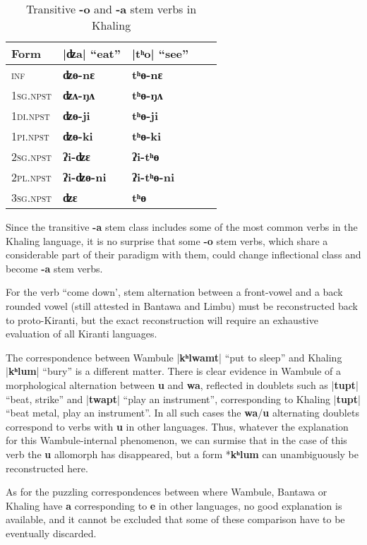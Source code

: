 \documentclass[oldfontcommands,oneside,a4paper,11pt]{article}
\newcommand{\ipa}[1]{\textbf{{\phon\mbox{#1}}}} %
\newcommand{\grise}[1]{\cellcolor{lightgray}\textbf{#1}}
\newcommand{\dhatu}[2]{|\ipa{#1}| ``#2''}
\begin{document}
\begin{table}[H]
\caption{Transitive \ipa{-o} and \ipa{-a} stem verbs in Khaling} \centering \label{tab:a.o}
\begin{tabular}{lllll}
\toprule
Form &\dhatu{ʣa}{eat} & \dhatu{tʰo}{see} \\
\midrule
\textsc{inf} & \ipa{ʣɵ-nɛ} \grise{}& \ipa{tʰɵ-nɛ} \grise{}\\
\textsc{1sg.npst} & \ipa{ʣʌ-ŋʌ} & \ipa{tʰɵ-ŋʌ} \\
\textsc{1di.npst} & \ipa{ʣɵ-ji} \grise{}& \ipa{tʰɵ-ji} \grise{}\\
\textsc{1pi.npst} & \ipa{ʣɵ-ki} \grise{}& \ipa{tʰɵ-ki} \grise{}\\
\textsc{2sg.npst} & \ipa{ʔi-ʣɛ} & \ipa{ʔi-tʰɵ} \\
\textsc{2pl.npst} & \ipa{ʔi-ʣɵ-ni} \grise{}& \ipa{ʔi-tʰɵ-ni} \grise{}\\
\textsc{3sg.npst} & \ipa{ʣɛ} & \ipa{tʰɵ} \\
\bottomrule
\end{tabular}
\end{table}

Since the transitive  \ipa{-a} stem class includes some of the most common verbs in the Khaling language, it is no surprise that some \ipa{-o} stem verbs, which share a considerable part of their paradigm with them, could change inflectional class and become  \ipa{-a} stem verbs.

For the verb ``come down', stem alternation between a front-vowel and a back rounded vowel (still attested in Bantawa and Limbu) must be reconstructed back to proto-Kiranti, but the exact reconstruction will require an exhaustive evaluation of all Kiranti languages.

The correspondence between Wambule \dhatu{kʰlwamt}{put to sleep} and Khaling \dhatu{kʰlum}{bury}  is a different matter. There is clear evidence in Wambule of a morphological alternation between \ipa{u} and \ipa{wa}, reflected in doublets such as \dhatu{tupt}{beat, strike} and \dhatu{twapt}{play an instrument}, corresponding to Khaling  \dhatu{tupt}{beat metal, play an instrument}. In all such cases the \ipa{wa}/\ipa{u} alternating doublets correspond to verbs with \ipa{u} in other languages. Thus, whatever the explanation for this Wambule-internal phenomenon, we can surmise that in the case of this verb the \ipa{u} allomorph has disappeared, but a form *\ipa{kʰlum} can unambiguously be reconstructed here.



As for the puzzling correspondences between where Wambule, Bantawa or Khaling have \ipa{a} corresponding to \ipa{e} in other languages, no good explanation is available, and it cannot be excluded that some of these comparison have to be eventually discarded.
\end{document}
